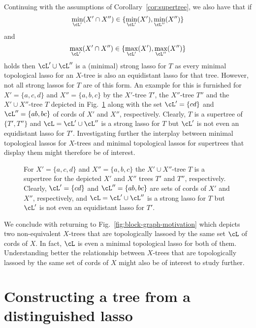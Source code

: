 Continuing with the assumptions of Corollary~\ref{cor:supertree}, we also have
that if
\begin{equation*}
  \min_{\cL'}(X'\cap X'')\in \{\min_{\cL'}(X'), \min_{\cL''}(X'')\}
\end{equation*}
and
\begin{equation*}
  \max_{\cL'}(X'\cap X'')\in \{\max_{\cL'}(X'), \max_{\cL''}(X'')\}
\end{equation*}
holds then $\cL'\cup \cL''$ is a (minimal) strong lasso for $T$ as every
minimal topological lasso for an $X$-tree is also an equidistant lasso for
that tree. However, not all strong lassos for $T$ are of this form. An example
for this is furnished for $X'=\{a,c,d\}$ and $X''=\{a,b,c\}$ by the $X'$-tree
$T'$, the $X''$-tree $T''$ and the $X'\cup X''$-tree $T$ depicted in
Fig.~\ref{fig:supertree} along with the set $\cL'=\{cd\}$ and
$\cL''=\{ab,bc\}$ of cords of $X'$ and $X''$, respectively. Clearly, $T$ is a
supertree of $\{T',T''\}$ and $\cL=\cL'\cup\cL''$ is a strong lasso for $T$
but $\cL'$ is not even an equidistant lasso for $T'$. Investigating further
the interplay between minimal topological lassos for $X$-trees and minimal
topological lassos for supertrees that display them might therefore be of
interest.

\begin{figure}[h]
  \begin{center}
    
  \end{center}
  \caption{ For $X'=\{a,c,d\}$ and $X''=\{a,b,c\}$ the $X'\cup X''$-tree $T$
    is a supertree for the depicted $X'$ and $X''$ trees $T'$ and $T''$,
    respectively. Clearly, $\cL'=\{cd\}$ and $\cL''=\{ab,bc\}$ are sets of
    cords of $X'$ and $X''$, respectively, and $\cL=\cL'\cup\cL''$ is a strong
    lasso for $T$ but $\cL'$ is not even an equidistant lasso for $T'$.  }
  \label{fig:supertree}
\end{figure}

We conclude with returning to Fig.~\ref{fig:block-graph-motivation} which
depicts two non-equivalent $X$-trees that are topologically lassoed by the
same set $\cL$ of cords of $X$. In fact, $\cL$ is even a minimal topological
lasso for both of them.  Understanding better the relationship between
$X$-trees that are topologically lassoed by the same set of cords of $X$ might
also be of interest to study further.

\section{Constructing a tree from a distinguished lasso}
\label{sec:constr-tree-from}

